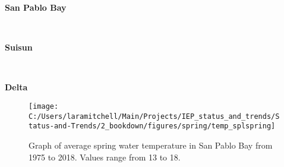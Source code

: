 \documentclass[
]{book}
\begin{document}
\begin{panel-grid}

\begin{columns-nocenter}

\begin{column800}

\textbf{San Pablo Bay}

\end{column800}

\begin{column40}

~

\end{column40}

\begin{column800}

\textbf{Suisun}

\end{column800}

\begin{column40}

~

\end{column40}

\begin{column800}

\textbf{Delta}

\end{column800}

\end{columns-nocenter}

\begin{columns-nocenter}

\begin{column800}

\begin{expand}

\begin{figure}
\texttt{[image: C:/Users/laramitchell/Main/Projects/IEP\_status\_and\_trends/Status-and-Trends/2\_bookdown/figures/spring/temp\_splspring]} \caption{Graph of average spring water temperature in San Pablo Bay from 1975 to 2018. Values range from 13 to 18.}\label{fig:unnamed-chunk-14}
\end{figure}

\end{expand}

\end{column800}

\begin{column40}

~


\end{column40}
\end{columns-nocenter}
\end{panel-grid}
\end{document}
